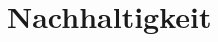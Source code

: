\documentclass[main.tex]{subfiles} %
\begin{document}
\section{Nachhaltigkeit}


\newpage
\end{document}
